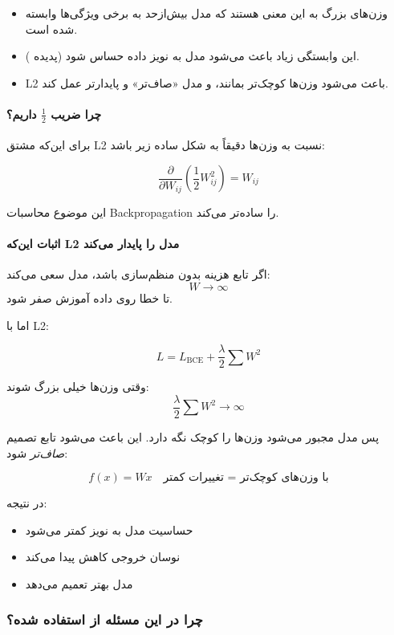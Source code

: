 \documentclass{article}
\begin{document}
\begin{itemize}
	\item وزن‌های بزرگ به این معنی هستند که مدل بیش‌ازحد به برخی ویژگی‌ها وابسته شده است.
	\item این وابستگی زیاد باعث می‌شود مدل به نویز داده حساس شود (پدیده ).
	\item L2 باعث می‌شود وزن‌ها کوچک‌تر بمانند، و مدل «صاف‌تر» و پایدارتر عمل کند.
\end{itemize}

\paragraph{چرا ضریب \(\tfrac{1}{2}\) داریم؟}

برای این‌که مشتق L2 نسبت به وزن‌ها دقیقاً به شکل ساده زیر باشد:

\[
\frac{\partial}{\partial W_{ij}} 
\left( \frac{1}{2} W_{ij}^2 \right)
= W_{ij}
\]

این موضوع محاسبات Backpropagation را ساده‌تر می‌کند.

\paragraph{اثبات این‌که L2 مدل را پایدار می‌کند}

اگر تابع هزینه بدون منظم‌سازی باشد، مدل سعی می‌کند:
\[
W \to \infty
\]
تا خطا روی داده آموزش صفر شود.

اما با L2:

\[
L = L_{\text{BCE}} + \frac{\lambda}{2}\sum W^2
\]

وقتی وزن‌ها خیلی بزرگ شوند:
\[
\frac{\lambda}{2}\sum W^2 \to \infty
\]

پس مدل مجبور می‌شود وزن‌ها را کوچک نگه دارد.  
این باعث می‌شود تابع تصمیم \emph{صاف‌تر} شود:

\[
f(x) = W x \quad \text{با وزن‌های کوچک‌تر = تغییرات کمتر}
\]

در نتیجه:
\begin{itemize}
	\item حساسیت مدل به نویز کمتر می‌شود  
	\item نوسان خروجی کاهش پیدا می‌کند  
	\item مدل بهتر تعمیم می‌دهد  
\end{itemize}

\subsubsection*{چرا در این مسئله از  استفاده شده؟}
\end{document}
